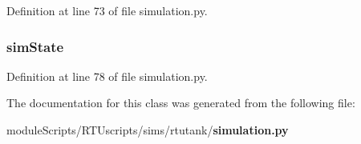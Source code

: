 Definition at line 73 of file simulation.\+py.

\subsubsection[{sim\+State}]{\setlength{\rightskip}{0pt plus 5cm}sim\+State}\label{classsims_1_1rtutank_1_1simulation_1_1_simulation_a41f89dc1173ec57bbed0975711b48c36}


Definition at line 78 of file simulation.\+py.



The documentation for this class was generated from the following file\+:\begin{DoxyCompactItemize}
\item 
module\+Scripts/\+R\+T\+Uscripts/sims/rtutank/{\bf simulation.\+py}\end{DoxyCompactItemize}
